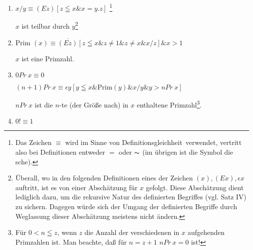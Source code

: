 \documentclass[draft]{scrartcl}
\begin{document}
\begin{enumerate}[1.]
	\item {}$x/y \equiv \left(Ez\right) \left[z \leqq x \& x = y.z\right]$%
%
\footnote{Das Zeichen $\equiv$ wird im Sinne von \glqq Definitionsgleichheit\grqq\ verwendet, vertritt also bei Definitionen entweder $=$ oder $\thicksim$ (im übrigen ist
	die Symbol die sche).}

		$x$ ist teilbar durch $y$\footnote{Überall, wo in den folgenden Definitionen eines der Zeichen $\left(x\right), \left(Ex\right), \epsilon x$ auftritt, ist es von einer Abschätzung für $x$ gefolgt. Diese Abschätzung dient lediglich dazu, um die rekursive Natur des definierten Begriffes (vgl. Satz IV) zu sichern. Dagegen würde sich der Umgang der definierten Begriffe durch Weglassung dieser Abschätzung meistens nicht ändern.}

	\item {}$\text{Prim }\left(x\right) \equiv \overline{\left(Ez\right)} \left[z \leqq x \& z \not = 1 \& z \not = x \& x/z\right] \& x > 1$

	$x$ ist eine Primzahl.

	\item {} $0 Pr\ x \equiv 0$%

	$\left(n + 1\right) Pr\ x \equiv \epsilon y \left[y \leqq x \& \text{Prim}\left(y\right) \& x/y \& y > n Pr\ x\right]$%
	\let\originalfootnote=\thefootnote
	\let\thefootnote=\fnvierunddreissiga

	$n Pr\ x$ ist die $n$-te (der Größe nach) in $x$ enthaltene Primzahl\footnote{Für $0 < n \leqq z$, wenn $z$ die Anzahl der verschiedenen in $x$ aufgehenden Primzahlen ist. Man beachte, daß für $n = z + 1$ \hspace{0.5cm} $n Pr\ x = 0$ ist!}.
	\let\thefootnote=\originalfootnote
	\setcounter{footnote}{35}

	\item {}$0! \equiv 1$


\end{enumerate}
\end{document}
